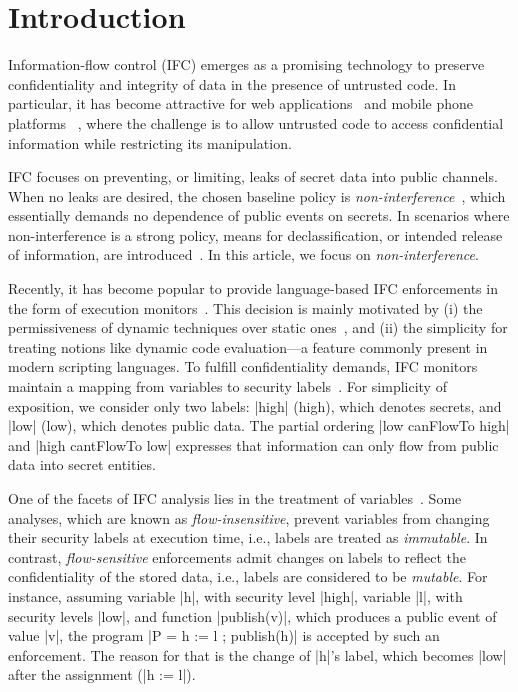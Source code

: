 \section{Introduction}
\label{sec:intro}

Information-flow control (IFC) emerges as a promising technology to preserve
confidentiality and integrity of data in the presence of untrusted code.  In
particular, it has become attractive for web 
applications~\citep[e.g.][]{DeGroef:2012:FWB:2382196.2382275, giffin:hails,
  yang:2013:towards, conf/esorics/AkhaweLHSS13, Hedin13} and mobile phone
platforms ~\citep[e.g.][]{Enck:2010,android:esorics13}, where the challenge is
to allow untrusted code to access confidential information while restricting its
manipulation.

IFC focuses on preventing, or limiting, leaks of secret data into public
channels. When no leaks are desired, the chosen baseline policy is
\emph{non-interference}~\citep{Goguen:Meseguer:Noninterference}, which 
essentially demands no dependence of public events on secrets. In scenarios where
non-interference is a strong policy, means for declassification, or intended
release of information, are introduced~\citep{Sabelfeld:Sands:CSFW05}. In this
article, we focus on \emph{non-interference}. 

Recently, it has become popular to provide language-based IFC enforcements in
the form of execution monitors~\citep{Hedin2011}. This decision is mainly
motivated by (i) the permissiveness of dynamic techniques over static
ones~\citep{Sabelfeld:Russo:PSI09}, and (ii) the simplicity for treating notions
like dynamic code evaluation---a feature commonly present in modern scripting
languages. To fulfill confidentiality demands, IFC monitors maintain a
mapping from variables to security labels~\citep{myers:dlm,Stefan:2011}.  
For simplicity of exposition, we consider only two labels: |high| (high), which
denotes secrets, and |low| (low), which denotes public data. The partial ordering
|low canFlowTo high| and |high cantFlowTo low| expresses that information
can only flow from public data into secret entities.

One of the facets of IFC analysis lies in the treatment of
variables~\citep{Hunt:2006}. Some analyses, which are known as \emph{flow-insensitive},
prevent variables from changing their security labels at execution time, i.e., labels
are treated as \emph{immutable}. In contrast, \emph{flow-sensitive} enforcements
admit changes on labels to reflect the confidentiality of the stored data, i.e.,
labels are considered to be \emph{mutable}. For instance, assuming variable |h|,
with security level |high|, variable |l|, with security levels |low|, and
function |publish(v)|, which produces a public event of value |v|, the program
|P = h := l ; publish(h)| is accepted by such an enforcement. The reason for
that is the change of |h|'s label, which becomes |low| after
the assignment (|h := l|).

